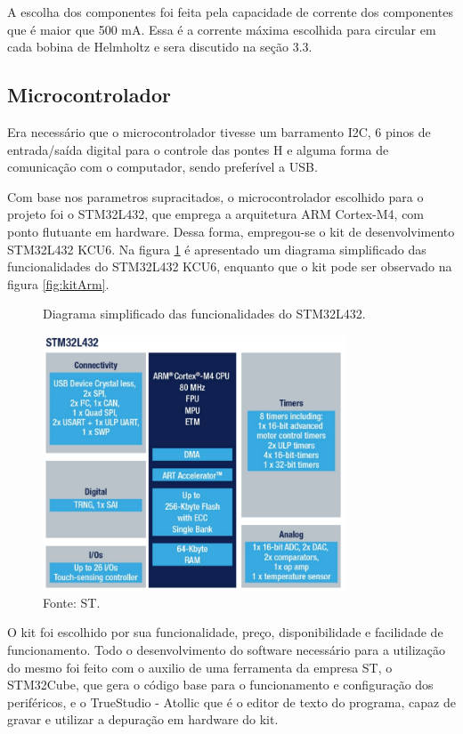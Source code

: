 A escolha dos componentes foi feita pela capacidade de corrente dos componentes que é maior que 500 mA. Essa é a corrente máxima escolhida para circular em cada bobina de Helmholtz e sera discutido na seção 3.3.

\subsection{Microcontrolador}

Era necessário que o microcontrolador tivesse um barramento I2C, 6 pinos de entrada/saída digital para o controle das pontes H e alguma forma de comunicação com o computador, sendo preferível a USB.

Com base nos parametros supracitados, o microcontrolador escolhido para o projeto foi o STM32L432, que emprega a arquitetura ARM Cortex-M4, com ponto flutuante em hardware. Dessa forma, empregou-se o kit de desenvolvimento STM32L432 KCU6. Na figura \ref{fig:diagArm} é apresentado um diagrama simplificado das funcionalidades do STM32L432 KCU6, enquanto que o kit pode ser observado na figura \ref{fig:kitArm}.

\begin{figure}[H]
    \centering
     \caption{Diagrama simplificado das funcionalidades do  STM32L432.}
     \includegraphics[width=0.8\textwidth]{./img/imagensExplicacoes/diagramaArm.png}
     \caption*{Fonte: ST.}
     \label{fig:diagArm}
\end{figure}


O kit foi escolhido por sua funcionalidade, preço, disponibilidade e facilidade de funcionamento. Todo o desenvolvimento do software necessário para a utilização do mesmo foi feito com o auxilio de uma ferramenta da empresa ST, o STM32Cube, que gera o código base para o funcionamento e configuração dos periféricos, e o TrueStudio - Atollic que é o editor de texto do programa, capaz de gravar e utilizar a depuração em hardware do kit.

